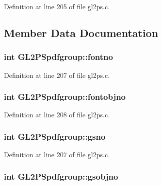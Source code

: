 Definition at line 205 of file gl2ps.\+c.



\subsection{Member Data Documentation}
\hypertarget{struct_g_l2_p_spdfgroup_ac18b08cce2f82cd4b3e870a5de018369}{}
\subsubsection[{fontno}]{\setlength{\rightskip}{0pt plus 5cm}int G\+L2\+P\+Spdfgroup\+::fontno}\label{struct_g_l2_p_spdfgroup_ac18b08cce2f82cd4b3e870a5de018369}


Definition at line 207 of file gl2ps.\+c.

\hypertarget{struct_g_l2_p_spdfgroup_a15a0090229f1ef42d04ab4854f890bb2}{}
\subsubsection[{fontobjno}]{\setlength{\rightskip}{0pt plus 5cm}int G\+L2\+P\+Spdfgroup\+::fontobjno}\label{struct_g_l2_p_spdfgroup_a15a0090229f1ef42d04ab4854f890bb2}


Definition at line 208 of file gl2ps.\+c.

\hypertarget{struct_g_l2_p_spdfgroup_a2cfb2eae774342666b632c550da6ed60}{}
\subsubsection[{gsno}]{\setlength{\rightskip}{0pt plus 5cm}int G\+L2\+P\+Spdfgroup\+::gsno}\label{struct_g_l2_p_spdfgroup_a2cfb2eae774342666b632c550da6ed60}


Definition at line 207 of file gl2ps.\+c.

\hypertarget{struct_g_l2_p_spdfgroup_af5a9629a4ff0d42c46927fadada346b4}{}
\subsubsection[{gsobjno}]{\setlength{\rightskip}{0pt plus 5cm}int G\+L2\+P\+Spdfgroup\+::gsobjno}\label{struct_g_l2_p_spdfgroup_af5a9629a4ff0d42c46927fadada346b4}


